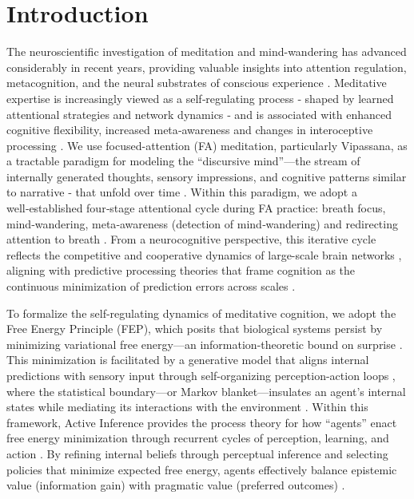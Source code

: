 \documentclass[openacc]{rsproca_new}%
\begin{document}
\rsbreak

\maketitle


\section{Introduction}
The neuroscientific investigation of meditation and mind-wandering has advanced considerably in recent years, providing valuable insights into attention regulation, metacognition, and the neural substrates of conscious experience \cite{BrandmeyerDelorme2021,Tang2015}. Meditative expertise is increasingly viewed as a self‑regulating process ‐ shaped by learned attentional strategies and network dynamics ‐ and is associated with enhanced cognitive flexibility, increased meta‑awareness and changes in interoceptive processing \cite{Dahl2015,Fox2014}. We  use focused-attention (FA) meditation, particularly Vipassana, as a tractable paradigm for modeling the “discursive mind”—the stream of internally generated thoughts, sensory impressions, and cognitive patterns similar to narrative ‐ that unfold over time \cite{Analayo2019}. Within this paradigm, we adopt a well‑established four‑stage attentional cycle during FA practice: breath focus, mind‑wandering, meta‑awareness (detection of mind‑wandering) and redirecting attention to breath \cite{Hasenkamp2012,Lutz2008}. From a neurocognitive perspective, this iterative cycle reflects the competitive and cooperative dynamics of large-scale brain networks \cite{ZamoraLopez2016}, aligning with predictive processing theories that frame cognition as the continuous minimization of prediction errors across scales \cite{BarrettSimmons2015,LaukkonenSlagter2021}. 

To formalize the self-regulating dynamics of meditative cognition, we adopt the Free Energy Principle (FEP), which posits that biological systems persist by minimizing variational free energy—an information-theoretic bound on surprise \cite{Friston2010}. This minimization is facilitated by a generative model that aligns internal predictions with sensory input through self-organizing perception-action loops \cite{ParrFriston2018}, where the statistical boundary—or Markov blanket—insulates an agent’s internal states while mediating its interactions with the environment \cite{Kirchhoff2018}. Within this framework, Active Inference provides the process theory for how “agents” enact free energy minimization through recurrent cycles of perception, learning, and action \cite{Friston2017,Ramstead2020}. By refining internal beliefs through perceptual inference and selecting policies that minimize expected free energy, agents effectively balance epistemic value (information gain) with pragmatic value (preferred outcomes) \cite{Friston2017}.
\end{document}
